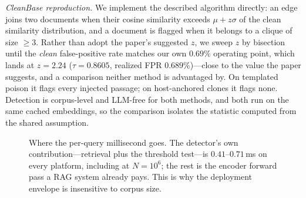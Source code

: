 \documentclass[10pt,journal,compsoc]{IEEEtran}
\begin{document}
\emph{CleanBase reproduction.} We implement the described algorithm directly: an edge joins two
documents when their cosine similarity exceeds $\mu + z\sigma$ of the clean similarity
distribution, and a document is flagged when it belongs to a clique of size $\ge 3$. Rather than
adopt the paper's suggested $z$, we sweep $z$ by bisection until the \emph{clean} false-positive
rate matches our own $0.69\%$ operating point, which lands at $z=2.24$ ($\tau=0.8605$,
realized FPR $0.689\%$)---close to the value the paper suggests, and a comparison neither method
is advantaged by. On templated poison it flags every injected passage; on host-anchored clones
it flags none. Detection is corpus-level and LLM-free for both methods, and both run on the same
cached embeddings, so the comparison isolates the statistic computed from the shared assumption.


\begin{figure}[t]
\centering
{}
\caption{Where the per-query millisecond goes. The detector's own contribution---retrieval plus
the threshold test---is $0.41$--$0.71$\,ms on every platform, including at $N=10^6$; the rest is
the encoder forward pass a RAG system already pays. This is why the deployment envelope is
insensitive to corpus size.}
\label{fig:latency}
\end{figure}
\end{document}
